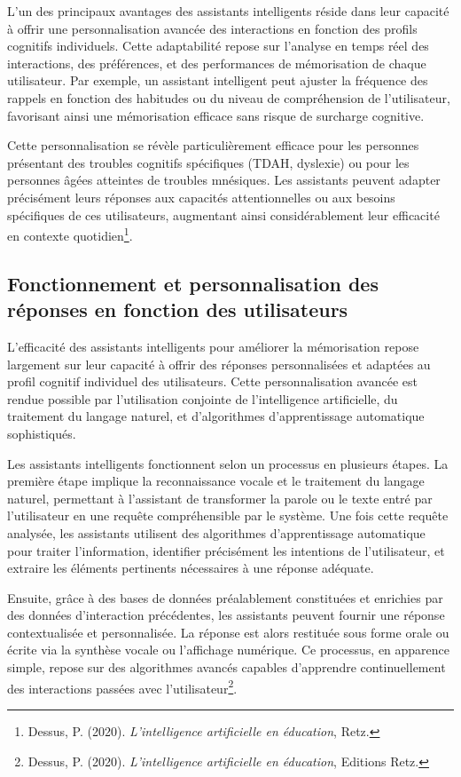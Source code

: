 \documentclass[11pt,a4paper]{report}
\begin{document}
L’un des principaux avantages des assistants intelligents réside dans leur capacité à offrir une personnalisation avancée des interactions en fonction des profils cognitifs individuels. Cette adaptabilité repose sur l’analyse en temps réel des interactions, des préférences, et des performances de mémorisation de chaque utilisateur. Par exemple, un assistant intelligent peut ajuster la fréquence des rappels en fonction des habitudes ou du niveau de compréhension de l'utilisateur, favorisant ainsi une mémorisation efficace sans risque de surcharge cognitive.

Cette personnalisation se révèle particulièrement efficace pour les personnes présentant des troubles cognitifs spécifiques (TDAH, dyslexie) ou pour les personnes âgées atteintes de troubles mnésiques. Les assistants peuvent adapter précisément leurs réponses aux capacités attentionnelles ou aux besoins spécifiques de ces utilisateurs, augmentant ainsi considérablement leur efficacité en contexte quotidien\footnote{Dessus, P. (2020). \textit{L’intelligence artificielle en éducation}, Retz.}.

\subsection{Fonctionnement et personnalisation des réponses en fonction des utilisateurs}

L’efficacité des assistants intelligents pour améliorer la mémorisation repose largement sur leur capacité à offrir des réponses personnalisées et adaptées au profil cognitif individuel des utilisateurs. Cette personnalisation avancée est rendue possible par l’utilisation conjointe de l’intelligence artificielle, du traitement du langage naturel, et d’algorithmes d’apprentissage automatique sophistiqués.

Les assistants intelligents fonctionnent selon un processus en plusieurs étapes. La première étape implique la reconnaissance vocale et le traitement du langage naturel, permettant à l’assistant de transformer la parole ou le texte entré par l’utilisateur en une requête compréhensible par le système. Une fois cette requête analysée, les assistants utilisent des algorithmes d’apprentissage automatique pour traiter l'information, identifier précisément les intentions de l’utilisateur, et extraire les éléments pertinents nécessaires à une réponse adéquate.

Ensuite, grâce à des bases de données préalablement constituées et enrichies par des données d’interaction précédentes, les assistants peuvent fournir une réponse contextualisée et personnalisée. La réponse est alors restituée sous forme orale ou écrite via la synthèse vocale ou l’affichage numérique. Ce processus, en apparence simple, repose sur des algorithmes avancés capables d’apprendre continuellement des interactions passées avec l’utilisateur\footnote{Dessus, P. (2020). \textit{L'intelligence artificielle en éducation}, Editions Retz.}.
\end{document}
